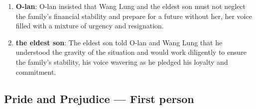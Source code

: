 \documentclass[10pt]{article}
\begin{document}
\begin{enumerate}
\item \textbf{O-lan}: O-lan insisted that Wang Lung and the eldest son must not neglect the family's financial stability and prepare for a future without her, her voice filled with a mixture of urgency and resignation.

\item \textbf{the eldest son}: The eldest son told O-lan and Wang Lung that he understood the gravity of the situation and would work diligently to ensure the family's stability, his voice wavering as he pledged his loyalty and commitment.

\end{enumerate}

\subsection*{Pride and Prejudice --- First person}
\end{document}
